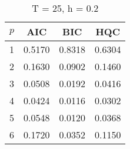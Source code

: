 \begin{table}[ht]
\captionsetup{justification=raggedright,singlelinecheck=false}
\caption*{T = 25, h = 0.2}
\begin{tabular}{c|ccc}
  $p$ & AIC & BIC & HQC \\\hline
  1 & 0.5170 & 0.8318 & 0.6304 \\
  2 & 0.1630 & 0.0902 & 0.1460 \\
  3 & 0.0508 & 0.0192 & 0.0416 \\
  4 & 0.0424 & 0.0116 & 0.0302 \\
  5 & 0.0548 & 0.0120 & 0.0368 \\
  6 & 0.1720 & 0.0352 & 0.1150 \\
\end{tabular}
\end{table}
